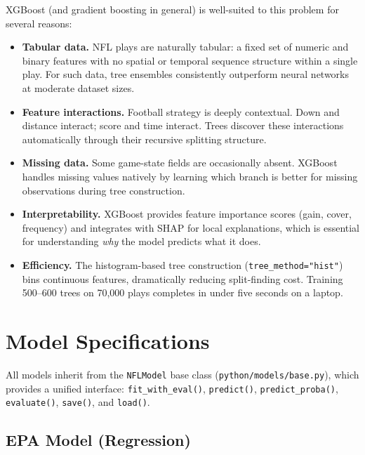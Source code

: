 \documentclass[11pt]{article}
\begin{document}
XGBoost (and gradient boosting in general) is well-suited to this problem for
several reasons:
\begin{itemize}
  \item \textbf{Tabular data.} NFL plays are naturally tabular: a fixed set of
    numeric and binary features with no spatial or temporal sequence structure
    within a single play. For such data, tree ensembles consistently outperform
    neural networks at moderate dataset sizes.
  \item \textbf{Feature interactions.} Football strategy is deeply contextual.
    Down and distance interact; score and time interact. Trees discover these
    interactions automatically through their recursive splitting structure.
  \item \textbf{Missing data.} Some game-state fields are occasionally absent.
    XGBoost handles missing values natively by learning which branch is better
    for missing observations during tree construction.
  \item \textbf{Interpretability.} XGBoost provides feature importance scores
    (gain, cover, frequency) and integrates with SHAP for local explanations,
    which is essential for understanding \emph{why} the model predicts what it does.
  \item \textbf{Efficiency.} The histogram-based tree construction (\texttt{tree\_method="hist"})
    bins continuous features, dramatically reducing split-finding cost. Training
    500--600 trees on 70,000 plays completes in under five seconds on a laptop.
\end{itemize}

\section{Model Specifications}
\label{sec:models}

All models inherit from the \texttt{NFLModel} base class
(\texttt{python/models/base.py}), which provides a unified interface:
\texttt{fit\_with\_eval()}, \texttt{predict()}, \texttt{predict\_proba()},
\texttt{evaluate()}, \texttt{save()}, and \texttt{load()}.

\subsection{EPA Model (Regression)}
\end{document}
